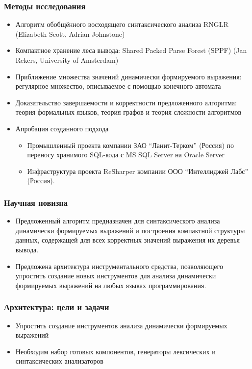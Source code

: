 \documentclass{beamer}
\begin{document}
\begin{frame}
    \transwipe[direction=90]
    \frametitle{Методы исследования}
        \begin{itemize}
            \item Алгоритм обобщённого восходящего синтаксического анализа RNGLR (Elizabeth Scott, Adrian Johnstone)
            \item Компактное хранение леса вывода: Shared Packed Parse Forest (SPPF) (Jan Rekers, University of Amsterdam)
            \item Приближение множества значений динамически формируемого выражения: регулярное множество, описываемое с помощью конечного автомата
            \item Доказательство завершаемости и корректности предложенного алгоритма: теория формальных языков, теория графов и теория сложности алгоритмов            
            \item Апробация созданного подхода 
            \begin{itemize}
                \item Промышленный проекта компании ЗАО “Ланит-Терком” (Россия) по переносу хранимого SQL-кода с MS SQL Server на Oracle Server
                \item Инфраструктура проекта ReSharper компании ООО “Интеллиджей Лабс” (Россия).
            \end{itemize}
        \end{itemize}
\end{frame}

\begin{frame}
    \transwipe[direction=90]
    \frametitle{Научная новизна}
    \begin{itemize}
        \item Предложенный алгоритм предназначен для синтаксического анализа динамически формируемых выражений и построения компактной структуры данных, содержащей для всех корректных значений выражения их деревья вывода.
        \item Предложена архитектура инструментального средства, позволяющего упростить создание новых инструментов для анализа динамически формируемых выражений на любых языках программирования.
    \end{itemize}
\end{frame}

\begin{frame}
    \transwipe[direction=90]
    \frametitle{Архитектура: цели и задачи}
    \begin{itemize}
        \item Упростить создание инструментов анализа динамически формируемых выражений
        \item Необходим набор готовых компонентов, генераторы лексических и синтаксических анализаторов
    \end{itemize}
\end{frame}
\end{document}
